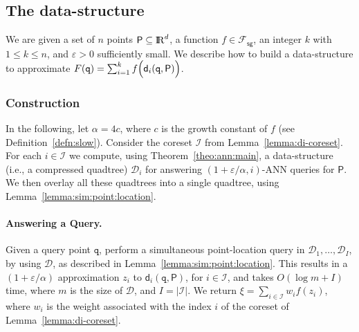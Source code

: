 \documentclass[12pt]{article}
\makeatletter
\providecommand{\lemref}[1]{Lemma~\ref{lemma:#1}}
\newcommand{\Term}[1]{\textsf{#1}}
\newcommand{\TermI}[1]{\Term{#1}\index{#1@\Term{#1}}}
\theoremstyle{remark}{\theorembodyfont{\rm} \newtheorem{remark}[theorem]{Remark}}
\newcommand{\thmref}[1]{Theorem~\ref{theo:#1}}
\newcommand{\defref}[1]{Definition~\ref{defn:#1}}
\newcommand{\MakeSBig}{\rule[0.0cm]{0.0cm}{0.35cm}} \newcommand{\brc}[1]{\left\{ {#1} \right\}}
\newcommand{\pth}[2][\!]{#1\left({#2}\right)}
\newcommand{\distPk}[3]{\mathsf{d}_{#3}\pth{#2,#1}}
\newcommand{\cardin}[1]{\left\lvert {#1} \right\rvert}
\newcommand{\eps}{{\varepsilon}}\newcommand{\divides}{|}
\newcommand{\DDM}[2]{F}
\newcommand{\IdxSet}{\mathcal{I}}
\newcommand{\FSF}{\mathcal{F}_{\mathsf{sg}}}
\newcommand{\ANN}{\TermI{ANN}\xspace}
\renewcommand{\Re}{{\rm I\!\hspace{-0.025em} R}}
\newcommand{\PntSet}{\mathsf{P}}
\newcommand{\query}{\mathtt{q}}
\newcommand{\constB}{c}
\newcommand{\numA}{z}
\newcommand{\DS}{\mathcal{D}}\newcommand{\Array}{\mathcal{X}}
\makeatother
\begin{document}
\subsection{The data-structure}
We are given a set of $n$ points $\PntSet \subseteq \Re^d$, a function
$f \in \FSF$, an integer $k$ with $1 \leq k \leq n$, and $\eps>0$ sufficiently
small. We describe how to build a data-structure to approximate
$\DDM{k}{f}(\query) = \sum_{i=1}^k f\pth{ \MakeSBig
       \distPk{\PntSet}{\query}{i}}$.
\subsubsection{Construction}
In the following, let $\alpha = 4 \constB$, 
where $\constB$ is the growth constant of $f$ (see
\defref{slow}).  Consider the coreset $\IdxSet$ from
\lemref{di-coreset}.  For each $i \in \IdxSet$ we compute, using
\thmref{ann:main}, a data-structure (i.e., a compressed quadtree)
$\DS_i$ for answering $(1+\eps/\alpha,i)$-\ANN queries for $\PntSet$. 
We then overlay all these
quadtrees into a single quadtree, using \lemref{sim:point:location}.


\paragraph{Answering a Query.}
Given a query point $\query$, perform a simultaneous point-location
query in $\DS_1, \ldots, \DS_I$, by using $\DS$, as described in
\lemref{sim:point:location}.  This results in a $(1+\eps/\alpha)$
approximation $\numA_i$ to $\distPk{\PntSet}{\query}{i}$, for $i \in
\IdxSet$, and takes $O( \log m + I)$ time, where $m$ is the size of
$\DS$, and $I = \cardin{\IdxSet}$.  We return $\xi = \sum_{i \in
   \IdxSet} w_i f\pth{\numA_i}$, where $w_i$ is the weight associated
with the index $i$ of the coreset of \lemref{di-coreset}.
\end{document}
